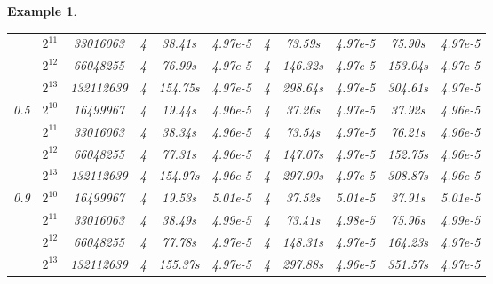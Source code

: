 \documentclass[11pt]{article}%
\numberwithin{equation}{section}
\newtheorem{example}{Example}
\begin{document}
\begin{example}
{\begin{table}[H]
\begin{center}
\begin{tabular}[c]{ccc|ccc|ccc|cc}
					&$2^{11}$ &33016063 &4   &38.41s  &4.97e-5 &4   &73.59s   &4.97e-5&75.90s &4.97e-5 \\
					&$2^{12}$ &66048255 &4   &76.99s  &4.97e-5 &4   &146.32s  &4.97e-5&153.04s&4.97e-5 \\
					&$2^{13}$ &132112639&4   &154.75s &4.97e-5 &4   &298.64s  &4.97e-5&304.61s&4.97e-5 \\
					\hline
					\multirow{4}{*}{0.5} 
					&$2^{10}$ &16499967 &4   &19.44s  &4.96e-5 &4   &37.26s   &4.97e-5&37.92s &4.96e-5 \\
					&$2^{11}$ &33016063 &4   &38.34s  &4.96e-5 &4   &73.54s   &4.97e-5&76.21s &4.96e-5 \\
					&$2^{12}$ &66048255 &4   &77.31s  &4.96e-5 &4   &147.07s  &4.97e-5&152.75s&4.96e-5 \\
					&$2^{13}$ &132112639&4   &154.97s &4.96e-5 &4   &297.90s  &4.97e-5&308.87s&4.96e-5 \\
					\hline
					\multirow{4}{*}{0.9}
					&$2^{10}$ &16499967 &4   &19.53s  &5.01e-5 &4   &37.52s   &5.01e-5&37.91s &5.01e-5 \\
					&$2^{11}$ &33016063 &4   &38.49s  &4.99e-5 &4   &73.41s   &4.98e-5&75.96s &4.99e-5 \\
					&$2^{12}$ &66048255 &4   &77.78s  &4.97e-5 &4   &148.31s  &4.97e-5&164.23s&4.97e-5 \\
					&$2^{13}$ &132112639&4   &155.37s &4.97e-5 &4   &297.88s  &4.96e-5&351.57s&4.97e-5 \\
					\hline
				\end{tabular}
			\end{center}
		\end{table}
		
}
\end{example}
\end{document}
